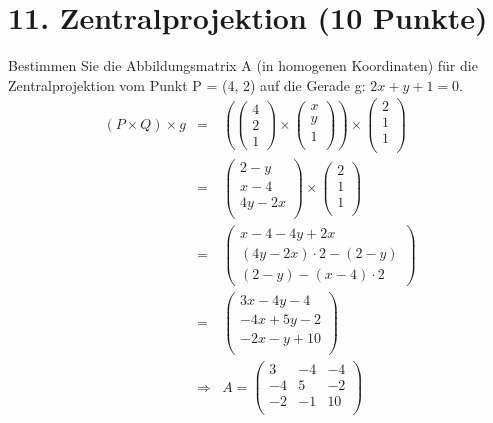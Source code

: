 \documentclass[11pt]{article}
\begin{document}
\section*{11. Zentralprojektion (10 Punkte)}
Bestimmen Sie die Abbildungsmatrix A (in homogenen Koordinaten) für die Zentralprojektion vom Punkt P = (4, 2) auf die Gerade g: $2x + y + 1 = 0$.
\begin{eqnarray}
(P \times Q) \times g &=& 
\left(
\begin{pmatrix}
4 \\ 2 \\ 1
\end{pmatrix} \times
\begin{pmatrix}
x \\ y \\ 1 \\
\end{pmatrix} \right) \times
\begin{pmatrix}
2 \\ 1 \\ 1 \\
\end{pmatrix} \\
&=& \begin{pmatrix}
2-y \\ x-4 \\ 4y-2x \\
\end{pmatrix}\times 
\begin{pmatrix}
2 \\ 1 \\ 1 \\
\end{pmatrix} \\
&=& \begin{pmatrix}
x-4 - 4y+2x \\
(4y-2x) \cdot 2 - (2-y) \\
(2-y) - (x-4)\cdot 2
\end{pmatrix} \\
&=&
\begin{pmatrix}
3x -4y -4 \\
-4x +5y -2 \\
-2x -y + 10 \\ 
\end{pmatrix}\\
&\Rightarrow & A= \begin{pmatrix}
3 & -4 & -4 \\
-4 & 5 & -2 \\
-2 & -1 & 10 \\
\end{pmatrix} 
\end{eqnarray}
\end{document}
